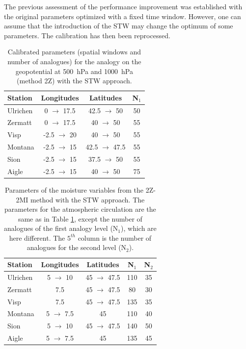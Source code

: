 \documentclass[hess]{copernicus}
\begin{document}
The previous assessment of the performance improvement was established with the original parameters optimized with a fixed time window. However, one can assume that the introduction of the STW may change the optimum of some parameters. The calibration has then been reprocessed.

\begin{table}[htb]
	\caption{Calibrated parameters (spatial windows and number of analogues) for the analogy on the geopotential at 500~hPa and 1000~hPa (method 2Z) with the STW approach.}
	\begin{center}
		\begin{tabular}{l c c c }
			\hline
			Station & Longitudes & Latitudes & N$_{1}$ \\
			\hline
			Ulrichen & 0 $\rightarrow$ 17.5 & 42.5 $\rightarrow$ 50 & 50 \\
			Zermatt & 0 $\rightarrow$ 17.5 & 40 $\rightarrow$ 50 & 55 \\
			Visp & -2.5 $\rightarrow$ 20 & 40 $\rightarrow$ 50 & 55 \\
			Montana & -2.5 $\rightarrow$ 15 & 42.5 $\rightarrow$ 47.5 & 55 \\
			Sion & -2.5 $\rightarrow$ 15 & 37.5 $\rightarrow$ 50 & 55 \\
			Aigle & -2.5 $\rightarrow$ 15 & 40 $\rightarrow$ 50 & 75 \\
			\hline
		\end{tabular}
	\end{center}
	\label{table:params_2Z_new}
\end{table}

\begin{table}[htb]
	\caption{Parameters of the moisture variables from the 2Z-2MI method with the STW approach. The parameters for the atmospheric circulation are the same as in Table \ref{table:params_2Z_new}, except the number of analogues of the first analogy level (N$_{1}$), which are here different. The $5^{th}$ column is the number of analogues for the second level (N$_{2}$).}
	\begin{center}
		\begin{tabular}{l c c c c }
			\hline
			Station & Longitudes & Latitudes & N$_{1}$ & N$_{2}$ \\
			\hline
			Ulrichen & 5 $\rightarrow$ 10 & 45 $\rightarrow$ 47.5 & 110 & 35 \\
			Zermatt & 7.5 & 45 $\rightarrow$ 47.5 & 80 & 30 \\
			Visp & 7.5 & 45 $\rightarrow$ 47.5 & 135 & 35 \\
			Montana & 5 $\rightarrow$ 7.5 & 45 & 110 & 40 \\
			Sion & 5 $\rightarrow$ 10 & 45 $\rightarrow$ 47.5 & 140 & 50 \\
			Aigle & 5 $\rightarrow$ 7.5 & 45 & 135 & 45 \\ 
			\hline
		\end{tabular}
	\end{center}
	\label{table:params_2Z-2MI_new}
\end{table}
\end{document}
